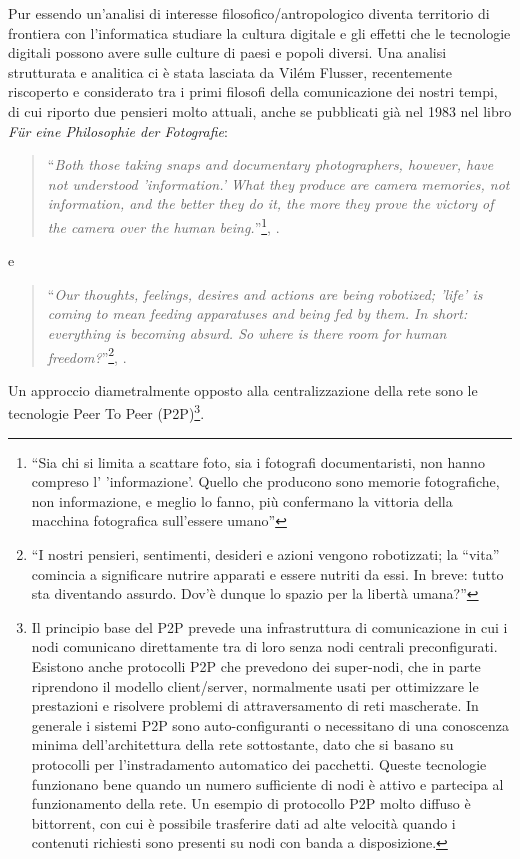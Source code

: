 Pur essendo un'analisi di interesse filosofico/antropologico diventa
territorio di frontiera con l'informatica studiare la cultura digitale
e gli effetti che le tecnologie digitali possono avere sulle culture
di paesi e popoli diversi. Una analisi strutturata e analitica ci è
stata lasciata da Vilém Flusser, recentemente riscoperto e considerato
tra i primi filosofi della comunicazione dei nostri tempi, di cui
riporto due pensieri molto attuali, anche se pubblicati già nel 1983
nel libro \emph{F{\"u}r eine Philosophie der Fotografie}:

\begin{quote}
  ``\emph{Both those taking snaps and documentary photographers, however,
  have not understood 'information.' What they produce are camera
  memories, not information, and the better they do it, the more they
  prove the victory of the camera over the human
  being.}''\footnote{``Sia chi si limita a scattare foto, sia i fotografi
documentaristi, non hanno compreso l' 'informazione'. Quello che
producono sono memorie fotografiche, non informazione, e meglio lo
fanno, più confermano la vittoria della macchina fotografica
sull'essere umano''}, \citet{flusser1983philosophie}.
\end{quote}

e 

\begin{quote}
  ``\emph{Our thoughts, feelings, desires and actions are being
    robotized; 'life' is coming to mean feeding apparatuses and being
    fed by them. In short: everything is becoming absurd. So where is
    there room for human freedom?}''\footnote{``I nostri pensieri,
    sentimenti, desideri e azioni vengono robotizzati; la ``vita''
    comincia a significare nutrire apparati e essere nutriti da
    essi. In breve: tutto sta diventando assurdo. Dov'è dunque lo
    spazio per la libertà umana?''}, \citet{flusser1983philosophie}.
\end{quote}

Un approccio diametralmente opposto alla centralizzazione della rete
sono le tecnologie Peer To Peer (P2P)\footnote{Il principio base del
  P2P prevede una infrastruttura di comunicazione in cui i nodi
  comunicano direttamente tra di loro senza nodi centrali
  preconfigurati. Esistono anche protocolli P2P che prevedono dei
  super-nodi, che in parte riprendono il modello client/server,
  normalmente usati per ottimizzare le prestazioni e risolvere
  problemi di attraversamento di reti mascherate. In generale i
  sistemi P2P sono auto-configuranti o necessitano di una conoscenza
  minima dell'architettura della rete sottostante, dato che si basano
  su protocolli per l'instradamento automatico dei pacchetti. Queste
  tecnologie funzionano bene quando un numero sufficiente di nodi è
  attivo e partecipa al funzionamento della rete. Un esempio di
  protocollo P2P molto diffuso è bittorrent, con cui è possibile
  trasferire dati ad alte velocità quando i contenuti richiesti sono
  presenti su nodi con banda a disposizione.}.

